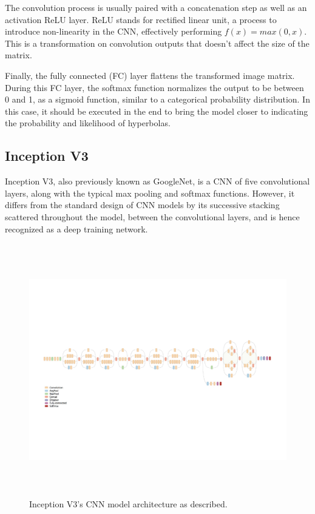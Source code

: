 \documentclass[se,blockletter]{uw-wkrpt}
\begin{document}
The convolution process is usually paired with a concatenation step as well as an activation ReLU layer. ReLU stands for rectified linear unit, a process to introduce non-linearity in the CNN, effectively performing $f(x) = max(0, x)$. This is a transformation on convolution outputs that doesn't affect the size of the matrix. 

Finally, the fully connected (FC) layer flattens the transformed image matrix. During this FC layer, the softmax function normalizes the output to be between 0 and 1, as a sigmoid function, similar to a categorical probability distribution. In this case, it should be executed in the end to bring the model closer to indicating the probability and likelihood of hyperbolas. 

\subsection{Inception V3}

Inception V3, also previously known as GoogleNet, is a CNN of five convolutional layers, along with the typical max pooling and softmax functions. However, it differs from the standard design of CNN models by its successive stacking scattered throughout the model, between the convolutional layers, and is hence recognized as a deep training network.

\begin{figure}
  \centering
  \includegraphics[height=11cm]{inception-architecture}
  \caption{Inception V3's CNN model architecture as described.~\cite{ref:}}
  \label{fig:inception-architecture}
\end{figure}
\end{document}
